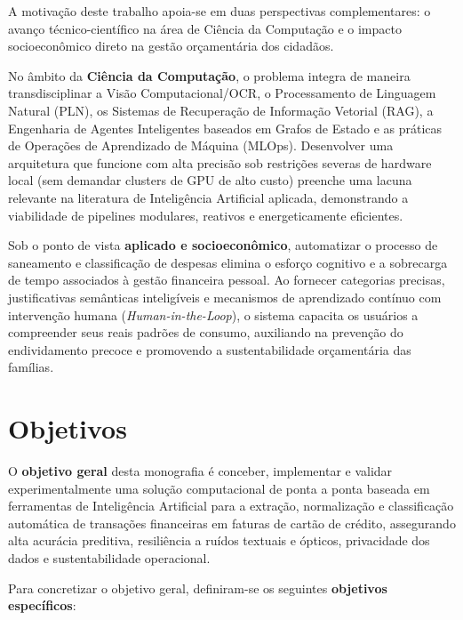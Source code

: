 \documentclass[
	12pt,				
	openright,			
	oneside,			
	a4paper,			
	english,			
	brazil				
	]{abntex2}
\begin{document}
A motivação deste trabalho apoia-se em duas perspectivas complementares: o avanço técnico-científico na área de Ciência da Computação e o impacto socioeconômico direto na gestão orçamentária dos cidadãos.

No âmbito da \textbf{Ciência da Computação}, o problema integra de maneira transdisciplinar a Visão Computacional/OCR, o Processamento de Linguagem Natural (PLN), os Sistemas de Recuperação de Informação Vetorial (RAG), a Engenharia de Agentes Inteligentes baseados em Grafos de Estado e as práticas de Operações de Aprendizado de Máquina (MLOps). Desenvolver uma arquitetura que funcione com alta precisão sob restrições severas de hardware local (sem demandar clusters de GPU de alto custo) preenche uma lacuna relevante na literatura de Inteligência Artificial aplicada, demonstrando a viabilidade de pipelines modulares, reativos e energeticamente eficientes.

Sob o ponto de vista \textbf{aplicado e socioeconômico}, automatizar o processo de saneamento e classificação de despesas elimina o esforço cognitivo e a sobrecarga de tempo associados à gestão financeira pessoal. Ao fornecer categorias precisas, justificativas semânticas inteligíveis e mecanismos de aprendizado contínuo com intervenção humana (\textit{Human-in-the-Loop}), o sistema capacita os usuários a compreender seus reais padrões de consumo, auxiliando na prevenção do endividamento precoce e promovendo a sustentabilidade orçamentária das famílias.

\section{Objetivos}
\label{sec:intro_objetivos}

O \textbf{objetivo geral} desta monografia é conceber, implementar e validar experimentalmente uma solução computacional de ponta a ponta baseada em ferramentas de Inteligência Artificial para a extração, normalização e classificação automática de transações financeiras em faturas de cartão de crédito, assegurando alta acurácia preditiva, resiliência a ruídos textuais e ópticos, privacidade dos dados e sustentabilidade operacional.

Para concretizar o objetivo geral, definiram-se os seguintes \textbf{objetivos específicos}:
\end{document}
